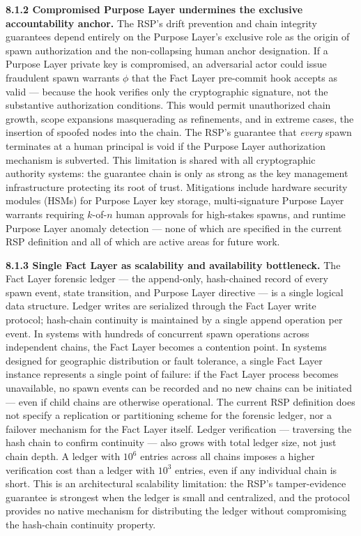 \medskip
\noindent\textbf{8.1.2  Compromised Purpose Layer undermines the exclusive accountability anchor.}
The RSP's drift prevention and chain integrity guarantees depend entirely on the Purpose Layer's exclusive role as the origin of spawn authorization and the non-collapsing human anchor designation. If a Purpose Layer private key is compromised, an adversarial actor could issue fraudulent spawn warrants $\phi$ that the Fact Layer pre-commit hook accepts as valid — because the hook verifies only the cryptographic signature, not the substantive authorization conditions. This would permit unauthorized chain growth, scope expansions masquerading as refinements, and in extreme cases, the insertion of spoofed nodes into the chain. The RSP's guarantee that \emph{every} spawn terminates at a human principal is void if the Purpose Layer authorization mechanism is subverted. This limitation is shared with all cryptographic authority systems: the guarantee chain is only as strong as the key management infrastructure protecting its root of trust. Mitigations include hardware security modules (HSMs) for Purpose Layer key storage, multi-signature Purpose Layer warrants requiring $k$-of-$n$ human approvals for high-stakes spawns, and runtime Purpose Layer anomaly detection — none of which are specified in the current RSP definition and all of which are active areas for future work.

\medskip
\noindent\textbf{8.1.3  Single Fact Layer as scalability and availability bottleneck.}
The Fact Layer forensic ledger — the append-only, hash-chained record of every spawn event, state transition, and Purpose Layer directive — is a single logical data structure. Ledger writes are serialized through the Fact Layer write protocol; hash-chain continuity is maintained by a single append operation per event. In systems with hundreds of concurrent spawn operations across independent chains, the Fact Layer becomes a contention point. In systems designed for geographic distribution or fault tolerance, a single Fact Layer instance represents a single point of failure: if the Fact Layer process becomes unavailable, no spawn events can be recorded and no new chains can be initiated — even if child chains are otherwise operational. The current RSP definition does not specify a replication or partitioning scheme for the forensic ledger, nor a failover mechanism for the Fact Layer itself. Ledger verification — traversing the hash chain to confirm continuity — also grows with total ledger size, not just chain depth. A ledger with $10^6$ entries across all chains imposes a higher verification cost than a ledger with $10^3$ entries, even if any individual chain is short. This is an architectural scalability limitation: the RSP's tamper-evidence guarantee is strongest when the ledger is small and centralized, and the protocol provides no native mechanism for distributing the ledger without compromising the hash-chain continuity property.

